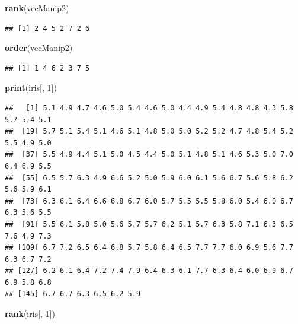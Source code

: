 \documentclass[
]{book}
\newenvironment{Shaded}{\begin{snugshade}}{\end{snugshade}}
\newcommand{\DecValTok}[1]{\textcolor[rgb]{0.00,0.00,0.81}{#1}}
\newcommand{\KeywordTok}[1]{\textcolor[rgb]{0.13,0.29,0.53}{\textbf{#1}}}
\newcommand{\NormalTok}[1]{#1}
\begin{document}
\begin{Shaded}
\begin{Highlighting}[]
\KeywordTok{rank}\NormalTok{(vecManip2)}
\end{Highlighting}
\end{Shaded}

\begin{verbatim}
## [1] 2 4 5 2 7 2 6
\end{verbatim}

\begin{Shaded}
\begin{Highlighting}[]
\KeywordTok{order}\NormalTok{(vecManip2)}
\end{Highlighting}
\end{Shaded}

\begin{verbatim}
## [1] 1 4 6 2 3 7 5
\end{verbatim}

\begin{Shaded}
\begin{Highlighting}[]
\KeywordTok{print}\NormalTok{(iris[, }\DecValTok{1}\NormalTok{])}
\end{Highlighting}
\end{Shaded}

\begin{verbatim}
##   [1] 5.1 4.9 4.7 4.6 5.0 5.4 4.6 5.0 4.4 4.9 5.4 4.8 4.8 4.3 5.8 5.7 5.4 5.1
##  [19] 5.7 5.1 5.4 5.1 4.6 5.1 4.8 5.0 5.0 5.2 5.2 4.7 4.8 5.4 5.2 5.5 4.9 5.0
##  [37] 5.5 4.9 4.4 5.1 5.0 4.5 4.4 5.0 5.1 4.8 5.1 4.6 5.3 5.0 7.0 6.4 6.9 5.5
##  [55] 6.5 5.7 6.3 4.9 6.6 5.2 5.0 5.9 6.0 6.1 5.6 6.7 5.6 5.8 6.2 5.6 5.9 6.1
##  [73] 6.3 6.1 6.4 6.6 6.8 6.7 6.0 5.7 5.5 5.5 5.8 6.0 5.4 6.0 6.7 6.3 5.6 5.5
##  [91] 5.5 6.1 5.8 5.0 5.6 5.7 5.7 6.2 5.1 5.7 6.3 5.8 7.1 6.3 6.5 7.6 4.9 7.3
## [109] 6.7 7.2 6.5 6.4 6.8 5.7 5.8 6.4 6.5 7.7 7.7 6.0 6.9 5.6 7.7 6.3 6.7 7.2
## [127] 6.2 6.1 6.4 7.2 7.4 7.9 6.4 6.3 6.1 7.7 6.3 6.4 6.0 6.9 6.7 6.9 5.8 6.8
## [145] 6.7 6.7 6.3 6.5 6.2 5.9
\end{verbatim}

\begin{Shaded}
\begin{Highlighting}[]
\KeywordTok{rank}\NormalTok{(iris[, }\DecValTok{1}\NormalTok{])}
\end{Highlighting}
\end{Shaded}
\end{document}
